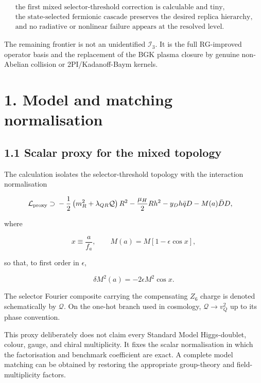 \documentclass[
  10pt,
]{article}
\begin{document}
\[
\boxed{
\begin{gathered}
\text{the first mixed selector-threshold correction is calculable and tiny,}\\
\text{the state-selected fermionic cascade preserves the desired replica hierarchy,}\\
\text{and no radiative or nonlinear failure appears at the resolved level.}
\end{gathered}
}
\]

The remaining frontier is not an unidentified \(\mathcal I_3\). It is
the full RG-improved operator basis and the replacement of the BGK
plasma closure by genuine non-Abelian collision or 2PI/Kadanoff-Baym
kernels.

\section{1. Model and matching
normalisation}\label{model-and-matching-normalisation}

\subsection{1.1 Scalar proxy for the mixed
topology}\label{scalar-proxy-for-the-mixed-topology}

The calculation isolates the selector-threshold topology with the
interaction normalisation

\[
\begin{aligned}
\mathcal L_{\rm proxy}\supset{}&
-\frac12
\left(m_R^2+\lambda_{QR}\mathcal Q\right)R^2
-\frac{\mu_H}{2}Rh^2
-y_Dh\bar qD
-M(a)\bar DD,
\end{aligned}
\]

where

\[
x\equiv\frac a{f_a},
\qquad
M(a)=M\left[1-\epsilon\cos x\right],
\]

so that, to first order in \(\epsilon\),

\[
\delta M^2(a)=-2\epsilon M^2\cos x.
\]

The selector Fourier composite carrying the compensating \(Z_6\) charge
is denoted schematically by \(\mathcal Q\). On the one-hot branch used
in cosmology, \(\mathcal Q\to v_Q^2\) up to its phase convention.

This proxy deliberately does not claim every Standard Model
Higgs-doublet, colour, gauge, and chiral multiplicity. It fixes the
scalar normalisation in which the factorisation and benchmark
coefficient are exact. A complete model matching can be obtained by
restoring the appropriate group-theory and field-multiplicity factors.
\end{document}
